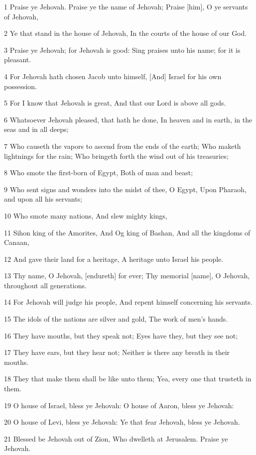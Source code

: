 \par 1 Praise ye Jehovah. Praise ye the name of Jehovah; Praise [him], O ye servants of Jehovah,
\par 2 Ye that stand in the house of Jehovah, In the courts of the house of our God.
\par 3 Praise ye Jehovah; for Jehovah is good: Sing praises unto his name; for it is pleasant.
\par 4 For Jehovah hath chosen Jacob unto himself, [And] Israel for his own possession.
\par 5 For I know that Jehovah is great, And that our Lord is above all gods.
\par 6 Whatsoever Jehovah pleased, that hath he done, In heaven and in earth, in the seas and in all deeps;
\par 7 Who causeth the vapors to ascend from the ends of the earth; Who maketh lightnings for the rain; Who bringeth forth the wind out of his treasuries;
\par 8 Who smote the first-born of Egypt, Both of man and beast;
\par 9 Who sent signs and wonders into the midst of thee, O Egypt, Upon Pharaoh, and upon all his servants;
\par 10 Who smote many nations, And slew mighty kings,
\par 11 Sihon king of the Amorites, And Og king of Bashan, And all the kingdoms of Canaan,
\par 12 And gave their land for a heritage, A heritage unto Israel his people.
\par 13 Thy name, O Jehovah, [endureth] for ever; Thy memorial [name], O Jehovah, throughout all generations.
\par 14 For Jehovah will judge his people, And repent himself concerning his servants.
\par 15 The idols of the nations are silver and gold, The work of men's hands.
\par 16 They have mouths, but they speak not; Eyes have they, but they see not;
\par 17 They have ears, but they hear not; Neither is there any breath in their mouths.
\par 18 They that make them shall be like unto them; Yea, every one that trusteth in them.
\par 19 O house of Israel, bless ye Jehovah: O house of Aaron, bless ye Jehovah:
\par 20 O house of Levi, bless ye Jehovah: Ye that fear Jehovah, bless ye Jehovah.
\par 21 Blessed be Jehovah out of Zion, Who dwelleth at Jerusalem. Praise ye Jehovah.

